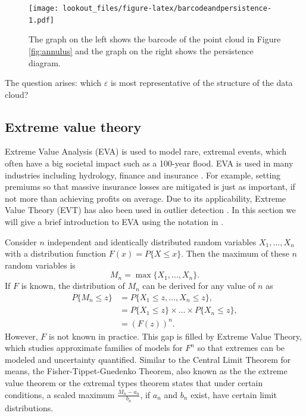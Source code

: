 \documentclass[11pt,a4paper,]{article}
\theoremstyle{definition}
\theoremstyle{definition}
\theoremstyle{definition}
\theoremstyle{remark}
\begin{document}
\begin{figure}
\centering
\texttt{[image: lookout\_files/figure-latex/barcodeandpersistence-1.pdf]}
\caption{\label{fig:barcodeandpersistence}The graph on the left shows the barcode of the point cloud in Figure \ref{fig:annulus} and the graph on the right shows the persistence diagram.}
\end{figure}

The question arises: which \(\varepsilon\) is most representative of the structure of the data cloud?

\hypertarget{subsec:evt}{%
\subsection{Extreme value theory}\label{subsec:evt}}

Extreme Value Analysis (EVA) is used to model rare, extremal events, which often have a big societal impact such as a 100-year flood. EVA is used in many industries including hydrology, finance and insurance \autocite{Reiss2001}. For example, setting premiums so that massive insurance losses are mitigated is just as important, if not more than achieving profits on average. Due to its applicability, Extreme Value Theory (EVT) has also been used in outlier detection \autocite{wilkinson2017visualizing,talagala2019anomaly}. In this section we will give a brief introduction to EVA using the notation in \textcite{coles2001introduction}.

Consider \(n\) independent and identically distributed random variables \(X_1, \dots, X_n\) with a distribution function \(F(x) = P\{X \leq x\}\). Then the maximum of these \(n\) random variables is
\begin{equation}\label{eq:evt1}
    M_n = \max \{X_1, \dots, X_n\} .
\end{equation}
If \(F\) is known, the distribution of \(M_n\) can be derived for any value of \(n\) as
\begin{align}\label{eq:evt2}
    P\{M_n \leq z \}
     & = P\{X_1 \leq z,  \dots,  X_n \leq z \} ,          \\
     & = P\{X_1 \leq z\} \times \dots \times P\{X_n \leq z\} , \\
     & = \left(F(z)\right)^n  .
\end{align}
However, \(F\) is not known in practice. This gap is filled by Extreme Value Theory, which studies approximate families of models for \(F^n\) so that extremes can be modeled and uncertainty quantified. Similar to the Central Limit Theorem for means, the Fisher-Tippet-Gnedenko Theorem, also known as the the extreme value theorem or the extremal types theorem states that under certain conditions, a scaled maximum \(\frac{M_n - a_n}{b_n}\), if \(a_n\) and \(b_n\) exist, have certain limit distributions.
\end{document}
